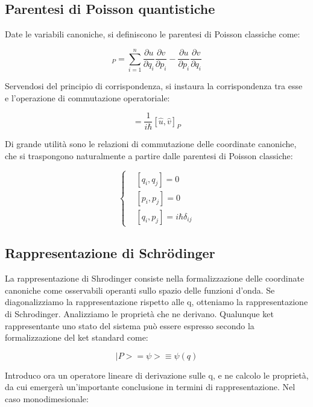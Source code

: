 \documentclass{article}
\begin{document}
\subsection{Parentesi di Poisson quantistiche}
Date le variabili canoniche, si definiscono le parentesi di Poisson classiche come:

\begin{equation}
    [u,v]_P = \sum_{i=1}^{n} \frac{\partial u}{\partial q_i}\frac{\partial v}{\partial p_i} - \frac{\partial u}{\partial p_i}\frac{\partial v}{\partial q_i}
\end{equation}

Servendosi del principio di corrispondenza, si instaura la corrispondenza tra esse e l'operazione di commutazione operatoriale:

\begin{equation}
    [\hat{u},\hat{v}]= \frac{1}{i\hbar}[\hat{u},\hat{v}]_P
\end{equation}

Di grande utilità sono le relazioni di commutazione delle coordinate canoniche, che si traspongono naturalmente a partire
dalle parentesi di Poisson classiche:

\begin{equation}
    \left\{
    \begin{aligned}
         & [q_i, q_j]=0                  \\
         & [p_i, p_j]=0                  \\
         & [q_i, p_j]=i\hbar \delta_{ij}
    \end{aligned}
    \right.
\end{equation}

\subsection{Rappresentazione di Schrödinger}
La rappresentazione di Shrodinger consiste nella formalizzazione delle coordinate canoniche come osservabili operanti sullo spazio delle funzioni d'onda.
Se diagonalizziamo la rappresentazione rispetto alle q, otteniamo la rappresentazione di Schrodinger.
Analizziamo le proprietà che ne derivano.
Qualunque ket rappresentante uno stato del sistema può essere espresso secondo la formalizzazione del ket standard come:

\begin{equation}
    |P>= \psi>\equiv \psi(q)
\end{equation}

Introduco ora un operatore lineare di derivazione sulle q, e ne calcolo le proprietà, da cui emergerà un'importante conclusione in termini di rappresentazione.
Nel caso monodimesionale:
\end{document}

